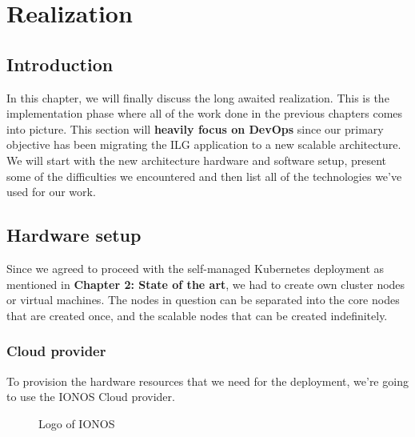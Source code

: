 \chapter{Realization}
\newpage

\setcounter{secnumdepth}{0} %
\section{Introduction}
In this chapter, we will finally discuss the long awaited realization.
This is the implementation phase where all of the work done in the previous chapters comes into picture.
This section will {\bf heavily focus on DevOps} since our primary objective has been migrating the ILG application to a new scalable architecture.
We will start with the new architecture hardware and software setup, present some of the difficulties we encountered and then list all of the technologies we've used for our work.

\setcounter{secnumdepth}{2} %
\section{Hardware setup}
Since we agreed to proceed with the self-managed Kubernetes deployment as mentioned in \textbf{Chapter 2: State of the art}, we had to create own cluster nodes or virtual machines.
The nodes in question can be separated into the core nodes that are created once, and the scalable nodes that can be created indefinitely.

\subsection{Cloud provider}
To provision the hardware resources that we need for the deployment, we're going  to use the IONOS Cloud provider.
\cite[Ionos is a web hosting company founded in Germany in 1988 and is currently owned by United Internet.]{ionos-wikipedia}
\begin{figure}[H]
    \centering
    \caption{Logo of IONOS}
    \label{fig:logo-of-ionos-cloud}
\end{figure}

